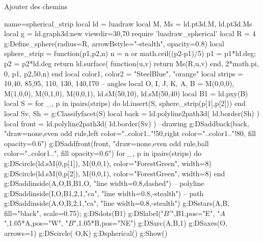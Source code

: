 \begin{demo}{Ajouter des chemins}
\begin{luadraw}{name=spherical_strip}
local ld = luadraw
local M, Ms = ld.pt3d.M, ld.pt3d.Ms
local g = ld.graph3d:new{ viewdir={30,70} }
require 'luadraw_spherical'
local R = 4
g:Define_sphere({radius=R, arrowBstyle="-stealth", opacity=0.8})
local sphere_strip = function(p1,p2,n)
    n = n or math.ceil((p2-p1)/5)
    p1 = p1*ld.deg; p2 = p2*ld.deg
    return ld.surface( function(u,v) return Ms(R,u,v) end, 2*math.pi, 0, p1, p2,{50,n})
end
local color1, color2 = "SteelBlue", "orange"
local strips ={ {10,40}, {85,95}, {110, 130}, {140,170} } -- angles
local O, I, J, K, A, B = M(0,0,0), M(1,0,0), M(0,1,0), M(0,0,1), ld.sM(50,10), ld.sM(50,40)
local B1 = ld.pxy(B)
local S = {}
for _, p in ipairs(strips) do
    ld.insert(S, sphere_strip(p[1],p[2]))
end
local Sv, Sh = g:Classifyfacet(S)
local back = ld.polyline2path3d( ld.border(Sh) )
local front = ld.polyline2path3d( ld.border(Sv) )
--drawing
g:DSaddback(back, "draw=none,even odd rule,left color="..color1.."!50,right color="..color1.."!80, fill opacity=0.6")
g:DSaddfront(front, "draw=none,even odd rule,ball color="..color1..", fill opacity=0.6")  
for _, p in ipairs(strips) do
    g:DScircle({ld.sM(0,p[1]), M(0,0,1)}, {color="ForestGreen", width=8})
    g:DScircle({ld.sM(0,p[2]), M(0,0,1)}, {color="ForestGreen", width=8})
end
g:DSaddinside({A,O,B,B1,O}, "line width=0.8,dashed") -- polyline
g:DSaddinside({I,O,B1,2,1,"ca"}, "line width=0.8,-stealth") -- path
g:DSaddinside({A,O,B,2,1,"ca"}, "line width=0.8,-stealth")
g:DSstars({A,B}, {fill="black", scale=0.75}); g:DSdots(B1)
g:DSlabel("$B'$",B1,{pos="E"}, "$A$",1.05*A,{pos="W"}, "$B$",1.05*B,{pos="NE"})
g:DSarc({A,B},1)
g:DSaxes(O, {arrows=1})
g:DScircle( {O,K})
g:Dspherical()
g:Show()
\end{luadraw}
\end{demo}

